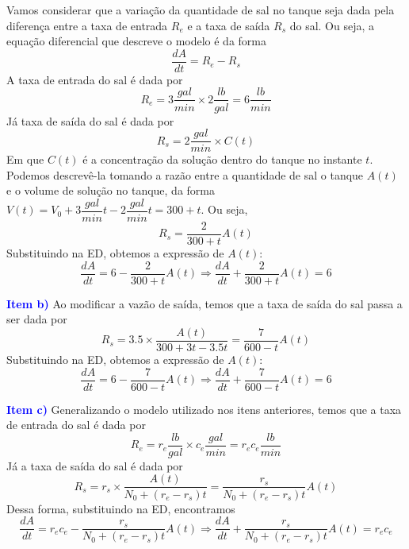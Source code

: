 \documentclass[oneside,12pt,a4paper]{report}
\begin{document}
\begin{tcolorbox}[enhanced, breakable, colback=blue!1!white,colframe=blue!75!black,title=\textbf{\hyperlink{quest:ex12}{\hypertarget{resp:ex12}{Exercício 12}}}]
\begin{figure}[H]
\begin{tikzpicture}
            \end{tikzpicture}
            \end{figure}

            \noindent Vamos considerar que a variação da quantidade de sal no tanque seja dada pela diferença entre a taxa de entrada $R_e$ e a taxa de saída $R_s$ do sal. Ou seja, a equação diferencial que descreve o modelo é da forma
            \[\frac{dA}{dt} = R_e - R_s\]
            \noindent A taxa de entrada do sal é dada por
            \[R_e = 3\frac{gal}{min} \times 2\frac{lb}{gal} = 6\frac{lb}{min}\]
            \noindent Já taxa de saída do sal é dada por
            \[R_s = 2\frac{gal}{min} \times C(t)\]
            \noindent Em que $C(t)$ é a concentração da solução dentro do tanque no instante $t$. Podemos descrevê-la tomando a razão entre a quantidade de sal o tanque $A(t)$ e o volume de solução no tanque, da forma $V(t)=V_0+3\dfrac{gal}{min}t-2\dfrac{gal}{min}t=300+t$. Ou seja,
            \[R_s=\frac{2}{300+t}A(t)\]
            \noindent Substituindo na ED, obtemos a expressão de $A(t)$:
            \[\frac{dA}{dt} = 6 - \frac{2}{300+t}A(t)\Rightarrow\boxed{\frac{dA}{dt} + \frac{2}{300+t}A(t) = 6}\]
            
            \noindent\textcolor{blue}{\textbf{Item b)}} Ao modificar a vazão de saída, temos que a taxa de saída do sal passa a ser dada por
            \[R_s = 3.5 \times \frac{A(t)}{300+3t-3.5t}=\frac{7}{600-t}A(t)\]
            \noindent Substituindo na ED, obtemos a expressão de $A(t)$:
            \[\frac{dA}{dt} = 6 - \frac{7}{600-t}A(t)\Rightarrow\boxed{\frac{dA}{dt} + \frac{7}{600-t}A(t) = 6}\]

            \noindent\textcolor{blue}{\textbf{Item c)}} Generalizando o modelo utilizado nos itens anteriores, temos que a taxa de entrada do sal é dada por
            \[R_e = r_e\frac{lb}{gal} \times c_e\frac{gal}{min} = r_ec_e\frac{lb}{min}\]
            \noindent Já a taxa de saída do sal é dada por
            \[R_s = r_s \times \frac{A(t)}{N_0+(r_e-r_s)t}=\frac{r_s}{N_0+(r_e-r_s)t}A(t)\]
            \noindent Dessa forma, substituindo na ED, encontramos
            \[\frac{dA}{dt}=r_ec_e-\frac{r_s}{N_0+(r_e-r_s)t}A(t)\Rightarrow\boxed{\frac{dA}{dt} + \frac{r_s}{N_0+(r_e-r_s)t}A(t) = r_ec_e}\]
        \end{tcolorbox}
\end{document}
